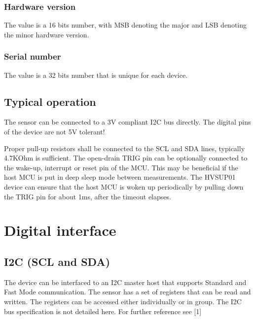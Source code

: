 \documentclass[a4paper]{article}
\begin{document}
\subsubsection[Hardware version]{ Hardware version}
\hypertarget{RefHeadingToc7093613373551}{}{
The value is a 16 bits number, with MSB denoting the major and LSB denoting the minor hardware version. }

\subsubsection[Serial number]{ Serial number}
\hypertarget{RefHeadingToc7113613373551}{}{
The value is a 32 bits number that is unique for each device.}

\subsection[Typical operation]{ Typical operation}
\hypertarget{RefHeadingToc2861383566216}{}{
The sensor can be connected to a 3V compliant I2C bus directly. The digital pins of the device are not 5V tolerant!}

{
Proper pull-up resistors shall be connected to the SCL and SDA lines, typically 4.7KOhm is sufficient. The open-drain
TRIG pin can be optionally connected to the wake-up, interrupt or reset pin of the MCU. This may be beneficial if the
host MCU is put in deep sleep mode between measurements. The HVSUP01 device can ensure that the host MCU is woken up
periodically by pulling down the TRIG pin for about 1ms, after the timeout elapses.}


\bigskip

\subsection[]{ }
\clearpage\section[Digital interface]{ Digital interface}
\hypertarget{RefHeadingToc1371383566216}{}\subsection[I2C (SCL and SDA)]{ I2C (SCL and SDA)}
\hypertarget{RefHeadingToc1300441299070}{}{
The device can be interfaced to an I2C master host that supports Standard and Fast Mode communication. The sensor has a
set of registers that can be read and written. The registers can be accessed either individually or in group. The I2C
bus specification is not detailed here. For further reference see [1]}
\end{document}
